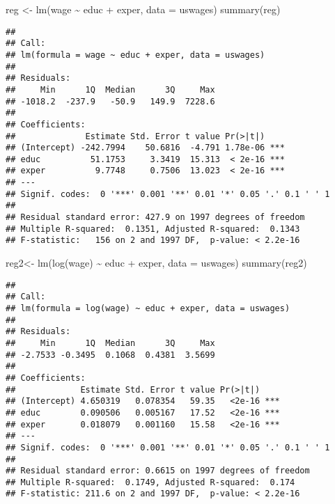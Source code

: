 \documentclass[
]{article}
\newenvironment{Shaded}{\begin{snugshade}}{\end{snugshade}}
\newcommand{\AttributeTok}[1]{\textcolor[rgb]{0.77,0.63,0.00}{#1}}
\newcommand{\FunctionTok}[1]{\textcolor[rgb]{0.00,0.00,0.00}{#1}}
\newcommand{\NormalTok}[1]{#1}
\newcommand{\OtherTok}[1]{\textcolor[rgb]{0.56,0.35,0.01}{#1}}
\newcommand{\SpecialCharTok}[1]{\textcolor[rgb]{0.00,0.00,0.00}{#1}}
\begin{document}
\begin{Shaded}
\begin{Highlighting}[]
\NormalTok{  reg }\OtherTok{\textless{}{-}} \FunctionTok{lm}\NormalTok{(wage }\SpecialCharTok{\textasciitilde{}}\NormalTok{ educ }\SpecialCharTok{+}\NormalTok{ exper, }\AttributeTok{data =}\NormalTok{ uswages)}
  \FunctionTok{summary}\NormalTok{(reg)}
\end{Highlighting}
\end{Shaded}

\begin{verbatim}
## 
## Call:
## lm(formula = wage ~ educ + exper, data = uswages)
## 
## Residuals:
##     Min      1Q  Median      3Q     Max 
## -1018.2  -237.9   -50.9   149.9  7228.6 
## 
## Coefficients:
##              Estimate Std. Error t value Pr(>|t|)    
## (Intercept) -242.7994    50.6816  -4.791 1.78e-06 ***
## educ          51.1753     3.3419  15.313  < 2e-16 ***
## exper          9.7748     0.7506  13.023  < 2e-16 ***
## ---
## Signif. codes:  0 '***' 0.001 '**' 0.01 '*' 0.05 '.' 0.1 ' ' 1
## 
## Residual standard error: 427.9 on 1997 degrees of freedom
## Multiple R-squared:  0.1351, Adjusted R-squared:  0.1343 
## F-statistic:   156 on 2 and 1997 DF,  p-value: < 2.2e-16
\end{verbatim}

\begin{Shaded}
\begin{Highlighting}[]
\NormalTok{  reg2}\OtherTok{\textless{}{-}} \FunctionTok{lm}\NormalTok{(}\FunctionTok{log}\NormalTok{(wage) }\SpecialCharTok{\textasciitilde{}}\NormalTok{ educ }\SpecialCharTok{+}\NormalTok{ exper, }\AttributeTok{data =}\NormalTok{ uswages)}
  \FunctionTok{summary}\NormalTok{(reg2)}
\end{Highlighting}
\end{Shaded}

\begin{verbatim}
## 
## Call:
## lm(formula = log(wage) ~ educ + exper, data = uswages)
## 
## Residuals:
##     Min      1Q  Median      3Q     Max 
## -2.7533 -0.3495  0.1068  0.4381  3.5699 
## 
## Coefficients:
##             Estimate Std. Error t value Pr(>|t|)    
## (Intercept) 4.650319   0.078354   59.35   <2e-16 ***
## educ        0.090506   0.005167   17.52   <2e-16 ***
## exper       0.018079   0.001160   15.58   <2e-16 ***
## ---
## Signif. codes:  0 '***' 0.001 '**' 0.01 '*' 0.05 '.' 0.1 ' ' 1
## 
## Residual standard error: 0.6615 on 1997 degrees of freedom
## Multiple R-squared:  0.1749, Adjusted R-squared:  0.174 
## F-statistic: 211.6 on 2 and 1997 DF,  p-value: < 2.2e-16
\end{verbatim}
\end{document}
